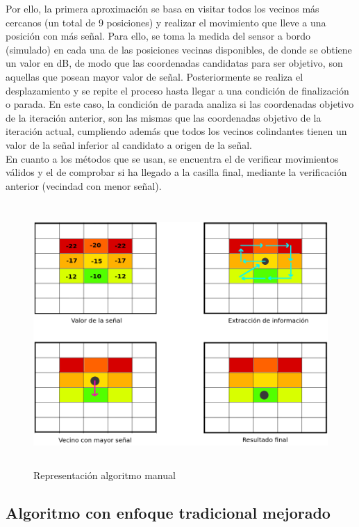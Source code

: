Por ello, la primera aproximación se basa en visitar todos los vecinos más cercanos (un total de 9 posiciones) y realizar el movimiento que lleve a una posición con más señal. Para ello, se toma la medida del sensor a bordo (simulado) en cada una de las posiciones vecinas disponibles, de donde se obtiene un valor en dB, de modo que las coordenadas candidatas para ser objetivo, son aquellas que posean mayor valor de señal. Posteriormente se realiza el desplazamiento y se repite el proceso hasta llegar a una condición de finalización o parada. En este caso, la condición de parada analiza si las coordenadas objetivo de la iteración anterior, son las mismas que las coordenadas objetivo de la iteración actual, cumpliendo además que todos los vecinos colindantes tienen un valor de la señal inferior al candidato a origen de la señal.\\

En cuanto a los métodos que se usan, se encuentra el de verificar movimientos válidos y el de comprobar si ha llegado a la casilla final, mediante la verificación anterior (vecindad con menor señal).\\

\begin{figure} [H]
    \begin{center}
    \includegraphics[height=10cm]{imagenes/cap4/9_algoritmo_manual.png}
    \end{center}
    \caption[Representación algoritmo manual]{Representación algoritmo manual}
    \label{fig:manual_algorithm}
\end{figure}

\subsection{Algoritmo con enfoque tradicional mejorado}
\label{subsec:alg-manual-opt}

